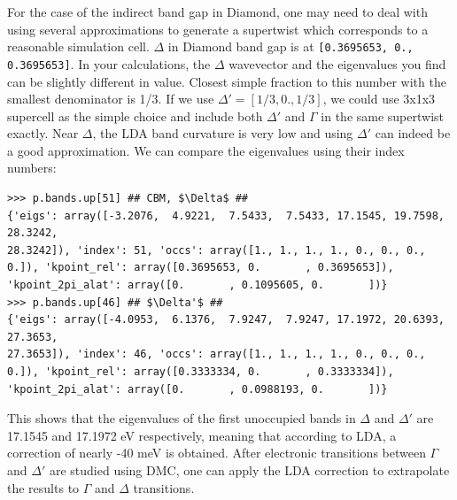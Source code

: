 For the case of the indirect band gap in Diamond, one may need to deal with using several approximations to generate a supertwist which corresponds to a reasonable simulation cell. 
$\Delta$ in Diamond band gap is at \texttt{[0.3695653, 0., 0.3695653]}. 
In your calculations, the $\Delta$ wavevector and the eigenvalues you find can be slightly different in value. 
Closest simple fraction to this number with the smallest denominator is 1/3. If we use $\Delta'=[1/3, 0., 1/3]$, we could use 3x1x3 supercell as the simple choice and include both $\Delta'$ and $\Gamma$ in the same supertwist exactly. 
Near  $\Delta$, the LDA band curvature is very low and using  $\Delta'$ can indeed be a good approximation. 
We can compare the eigenvalues using their index numbers:
\begin{lstlisting}[mathescape=true]
>>> p.bands.up[51] ## CBM, $\Delta$ ##
{'eigs': array([-3.2076,  4.9221,  7.5433,  7.5433, 17.1545, 19.7598, 28.3242,
28.3242]), 'index': 51, 'occs': array([1., 1., 1., 1., 0., 0., 0., 0.]), 'kpoint_rel': array([0.3695653, 0.       , 0.3695653]), 'kpoint_2pi_alat': array([0.       , 0.1095605, 0.       ])}
>>> p.bands.up[46] ## $\Delta'$ ##
{'eigs': array([-4.0953,  6.1376,  7.9247,  7.9247, 17.1972, 20.6393, 27.3653,
27.3653]), 'index': 46, 'occs': array([1., 1., 1., 1., 0., 0., 0., 0.]), 'kpoint_rel': array([0.3333334, 0.       , 0.3333334]), 'kpoint_2pi_alat': array([0.       , 0.0988193, 0.       ])}
\end{lstlisting}
This shows that the eigenvalues of the first unoccupied bands in $\Delta$ and $\Delta'$ are 17.1545 and 17.1972 eV respectively, meaning that according to LDA, a correction of nearly -40 meV is obtained. 
After electronic transitions between $\Gamma$ and $\Delta'$ are studied using DMC, one can apply the LDA correction to extrapolate the results to $\Gamma$ and $\Delta$ transitions.

